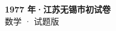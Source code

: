 \documentclass[zihao=-4, a4paper]{ctexart}
\begin{document}
\begin{center}
  {\Large\bfseries 1977 年·江苏无锡市初试卷}\\[4pt]
  {\large 数学 · 试题版}
\end{center}
\medskip
{}

\end{document}
